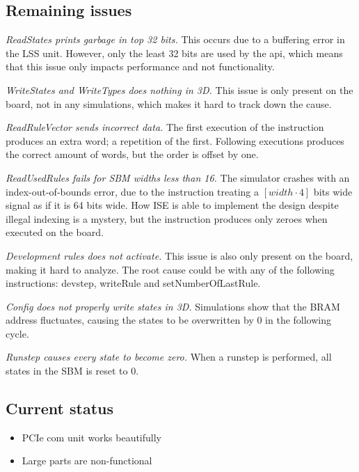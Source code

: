 \subsection{Remaining issues}

\emph{ReadStates prints garbage in top 32 bits.}
This occurs due to a buffering error in the LSS unit.
However, only the least 32 bits are used by the api, which means that this issue only impacts performance and not functionality.

\emph{WriteStates and WriteTypes does nothing in 3D.}
This issue is only present on the board, not in any simulations, which makes it hard to track down the cause.

\emph{ReadRuleVector sends incorrect data.}
The first execution of the instruction produces an extra word; a repetition of the first.
Following executions produces the correct amount of words, but the order is offset by one.

\emph{ReadUsedRules fails for SBM widths less than 16.}
The simulator crashes with an index-out-of-bounds error, due to the instruction treating a $[width\cdot4]$ bits wide signal as if it is 64 bits wide.
How ISE is able to implement the design despite illegal indexing is a mystery, but the instruction produces only zeroes when executed on the board.

\emph{Development rules does not activate.}
This issue is also only present on the board, making it hard to analyze.
The root cause could be with any of the following instructions: devstep, writeRule and setNumberOfLastRule.

\emph{Config does not properly write states in 3D.}
Simulations show that the BRAM address fluctuates, causing the states to be overwritten by 0 in the following cycle.

\emph{Runstep causes every state to become zero.}
When a runstep is performed, all states in the SBM is reset to 0.

\subsection{Current status}

\TODO

\begin{itemize}
    \item PCIe com unit works beautifully
    \item Large parts are non-functional
\end{itemize}

